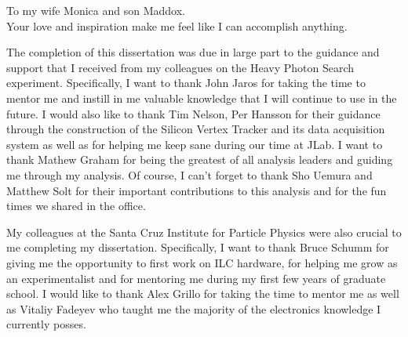 \documentclass[12pt]{ucthesis}
\begin{document}

\begin{frontmatter}

    \maketitle
    \copyrightpage
    
    \tableofcontents
    \listoffigures
    \listoftables

    \begin{abstract}
        \thispagestyle{plain}
        
    \end{abstract}

    \begin{dedication}
        \null\vfil
        {
            \begin{center}
                To my wife Monica and son Maddox. \\
                Your love and inspiration make me feel like I can accomplish anything.
            \end{center}
        }
        \vfil\null
    \end{dedication}

    \begin{acknowledgements}
        The completion of this dissertation was due in large part to the guidance
        and support that I received from my colleagues on the Heavy Photon Search
        experiment.  Specifically, I want to thank John Jaros for taking the
        time to mentor me and instill in me valuable knowledge that I will
        continue to use in the future.  I would also like to thank Tim Nelson, 
        Per Hansson for their guidance through the construction of the Silicon
        Vertex Tracker and its data acquisition system as well as for helping me 
        keep sane during our time at JLab. I want to thank
        Mathew Graham for being the greatest of all analysis leaders and 
        guiding me through my analysis.  Of course, I can't forget to thank
        Sho Uemura and Matthew Solt for their important contributions to this analysis
        and for the fun times we shared in the office.
        

        My colleagues at the Santa Cruz Institute for Particle Physics were also
        crucial to me completing my dissertation.  Specifically, I want to thank
        Bruce Schumm for giving me the opportunity to first work on ILC hardware,
        for helping me grow as an experimentalist and for mentoring me during 
        my first few years of graduate school.
        I would like to
        thank Alex Grillo for taking the time to mentor me as well as Vitaliy Fadeyev
        who taught me the majority of the electronics knowledge I currently posses.


\end{acknowledgements}
\end{frontmatter}
\end{document}
